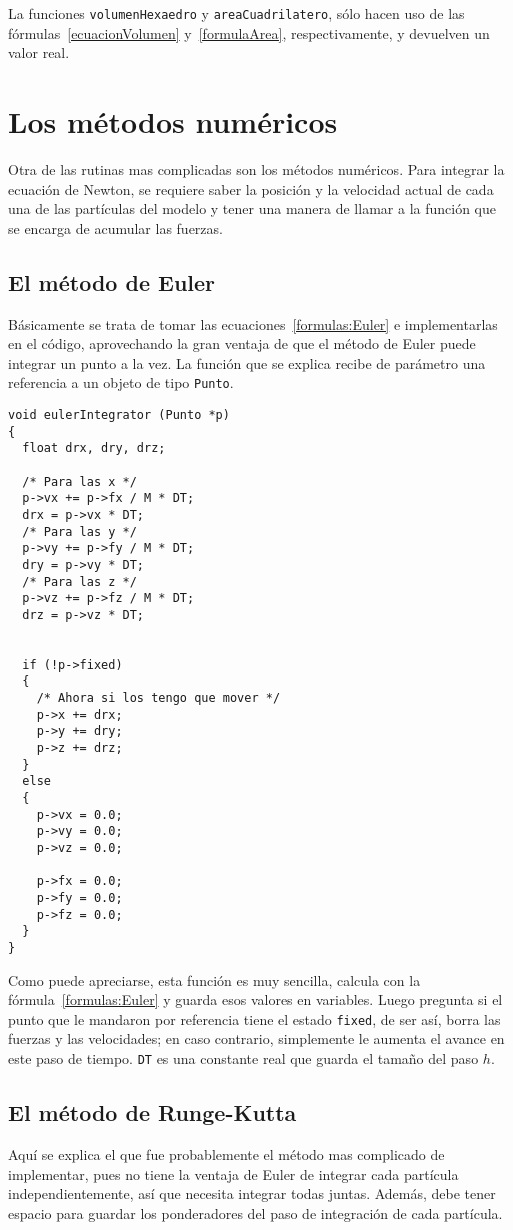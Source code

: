 La funciones \verb|volumenHexaedro| y \verb|areaCuadrilatero|, sólo hacen uso de las fórmulas~\ref{ecuacionVolumen} y~\ref{formulaArea}, respectivamente, y devuelven un valor real.

\section{Los métodos numéricos}
Otra de las rutinas mas complicadas son los métodos numéricos. Para integrar la ecuación de Newton, se requiere saber la posición y la velocidad actual de cada una de las partículas del modelo y tener una manera de llamar a la función que se encarga de acumular las fuerzas.
\subsection{El método de Euler}
Básicamente se trata de tomar las ecuaciones~\ref{formulas:Euler} e implementarlas en el código, aprovechando la gran ventaja de que el método de Euler puede integrar un punto a la vez. La función que se explica recibe de parámetro una referencia a un objeto de tipo \verb|Punto|.
\begin{verbatim}
void eulerIntegrator (Punto *p)
{
  float drx, dry, drz;

  /* Para las x */
  p->vx += p->fx / M * DT;
  drx = p->vx * DT;
  /* Para las y */
  p->vy += p->fy / M * DT;
  dry = p->vy * DT;
  /* Para las z */
  p->vz += p->fz / M * DT;
  drz = p->vz * DT;


  if (!p->fixed)
  {
    /* Ahora si los tengo que mover */
    p->x += drx;
    p->y += dry;
    p->z += drz;
  }
  else
  {
    p->vx = 0.0;
    p->vy = 0.0;
    p->vz = 0.0;

    p->fx = 0.0;
    p->fy = 0.0;
    p->fz = 0.0;
  }
}
\end{verbatim} 
Como puede apreciarse, esta función es muy sencilla, calcula con la fórmula~\ref{formulas:Euler} y guarda esos valores en variables. Luego pregunta si el punto que le mandaron por referencia tiene el estado \verb|fixed|, de ser así, borra las fuerzas y las velocidades; en caso contrario, simplemente le aumenta el avance en este paso de tiempo. \verb|DT| es una constante real que guarda el tamaño del paso $h$.
\subsection{El método de Runge-Kutta}
Aquí se explica el que fue probablemente el método mas complicado de implementar, pues no tiene la ventaja de Euler de integrar cada partícula independientemente, así que necesita integrar todas juntas. Además, debe tener espacio para guardar los ponderadores del paso de integración de cada partícula.

